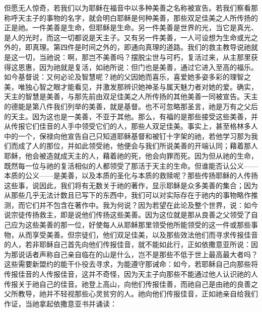 但愿无人惊奇，若我们以为耶稣在福音中以多种美善之名称被宣告。若我们察看那称呼天主子的事物的名字，就会明白耶稣是何种美善，那些双足佳美之人所传扬的正是祂。一件美善是生命，但耶稣是生命。另一件美善是世界的光，当它是真光、是人的光时，而这一切都说是天主子。又有另一件美善，一人可设想为生命或光之外的，即真理。第四件是时间之外的，即通向真理的道路。我们的救主教导说祂就是这一切，当祂说：啊，那岂不美善吗？摆脱尘世与可朽，复活过来，从主那里获得这恩惠，因为祂就是复活，如祂所说：但门也是美善，通过它进入至高的福乐。如今基督说：又何必论及智慧呢？祂的父因她而喜乐，喜爱她多姿多彩的理智之美，唯独心智之眼才能看见，并激发那辨识她神圣与属天魅力者对她的爱。确实，天主的智慧是美善，与那先前由双足佳美之人所传扬的其他美善一同被宣告。天主的德能是第八件我们列举的美善，就是基督。也不可忽略那圣言，祂是万有之父后的天主。因为这也是一美善，不亚于其他。那么，有福的是那些接受这些美善，并从传报它们佳音的人手中领受它们的人，那些人双足佳美。事实上，甚至格林多人中的一个，保禄向他宣告自己只知道耶稣基督和被钉十字架的祂，若他学习那为我们而成了人的那位，并如此领受祂，他便会与我们所说美善的开端认同；藉着那人耶稣，他会被造就成天主的人，藉着祂的死，他会向罪而死。因为但从祂的生命，既然每一位与祂的复活相似的人都领受了那活于天主的生命。但谁能否认公义——本质的公义——是美善，以及本质的圣化与本质的救赎呢？那些传扬耶稣的人传扬这些事，说因此，我们将有无数关于祂的著作，显示耶稣是众多美善的集合；因为从那些几乎无法计数且已写下的东西中，我们可以对实际存在于祂内的事物略作推测，而它们并不包含在著作中。我为何说？因为若望在此论及整个世界，说：如今说宗徒传扬救主，即是说他们传扬这些美善。因为这位就是那从良善之父领受了自己应为这些美善的那一位，好使每人从耶稣那里领受他所能领受的这一件或那些事物，从而享受美善。但宗徒们，他们双足佳美，以及那些效法他们而寻求传报佳音的人，若非耶稣自己首先向他们传报佳音，就不能如此行，正如依撒意亚所说：因为那说话者声称自己亲自临在的山是什么，岂不是那些不低于世上最高最大者吗？这些需要新盟约的能干仆役去寻求，为能遵守那诫命：如今，若耶稣自己向那些将传报佳音的人传报佳音，这并不奇怪，因为天主子向那些不能通过他人认识祂的人传报关于祂自己的佳音。祂登上高山，向他们传报佳善，而祂自己是由祂的良善之父所教导，祂并不轻视那些心灵贫穷的人。祂向他们传报佳音，正如祂亲自给我们作证，当祂拿起依撒意亚书并诵读：\par


